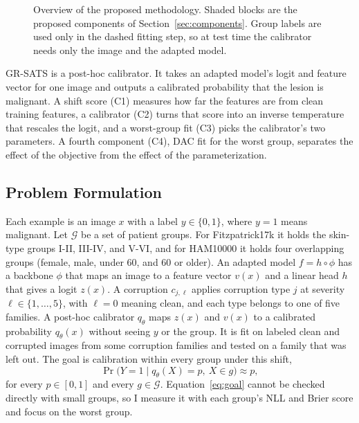 \documentclass[sigconf,nonacm]{acmart}
\begin{document}
\begin{figure}[t]
  \caption{Overview of the proposed methodology. Shaded blocks are the proposed components of Section~\ref{sec:components}. Group labels are used only in the dashed fitting step, so at test time the calibrator needs only the image and the adapted model.}
  \label{fig:framework}
\end{figure}

GR-SATS is a post-hoc calibrator. It takes an adapted model's logit and feature vector for one image and outputs a calibrated probability that the lesion is malignant. A shift score (C1) measures how far the features are from clean training features, a calibrator (C2) turns that score into an inverse temperature that rescales the logit, and a worst-group fit (C3) picks the calibrator's two parameters. A fourth component (C4), DAC fit for the worst group, separates the effect of the objective from the effect of the parameterization.

\subsection{Problem Formulation}
\label{sec:formulation}

Each example is an image $x$ with a label $y \in \{0,1\}$, where $y = 1$ means malignant. Let $\mathcal{G}$ be a set of patient groups. For Fitzpatrick17k it holds the skin-type groups I-II, III-IV, and V-VI, and for HAM10000 it holds four overlapping groups (female, male, under 60, and 60 or older). An adapted model $f = h \circ \phi$ has a backbone $\phi$ that maps an image to a feature vector $v(x)$ and a linear head $h$ that gives a logit $z(x)$. A corruption $c_{j,\ell}$ applies corruption type $j$ at severity $\ell \in \{1, \dots, 5\}$, with $\ell = 0$ meaning clean, and each type belongs to one of five families. A post-hoc calibrator $q_\theta$ maps $z(x)$ and $v(x)$ to a calibrated probability $q_\theta(x)$ without seeing $y$ or the group. It is fit on labeled clean and corrupted images from some corruption families and tested on a family that was left out. The goal is calibration within every group under this shift,
\begin{equation}
  \Pr\big(Y = 1 \mid q_\theta(X) = p,\ X \in g\big) \approx p,
  \label{eq:goal}
\end{equation}
for every $p \in [0,1]$ and every $g \in \mathcal{G}$. Equation~\eqref{eq:goal} cannot be checked directly with small groups, so I measure it with each group's NLL and Brier score and focus on the worst group.
\end{document}
